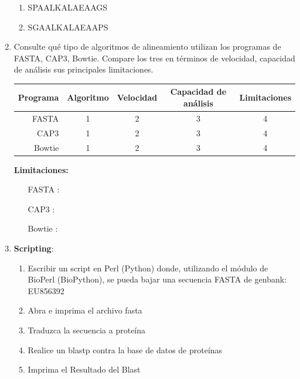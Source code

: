 \documentclass[twoside,letterpaper,12pt]{report}
\begin{document}
\begin{enumerate}
	\begin{enumerate}
		\item SPAALKALAEAAGS	
 		\item SGAALKALAEAAPS	 
	\end{enumerate}

	\item Consulte qué tipo de algoritmos de alineamiento utilizan los programas de FASTA, CAP3, Bowtie. Compare los tres en términos de velocidad, capacidad de análisis sus principales limitaciones.

	\begin{tabular}{|r|c|c|c|c|}
		\hline 
		Programa & Algoritmo & Velocidad & Capacidad de análisis & Limitaciones \\
		\hline
		FASTA & 1 & 2 & 3 & 4 \\
		\hline 
		CAP3 & 1 & 2 & 3 & 4 \\
		\hline
		Bowtie & 1 & 2 & 3 & 4 \\
		\hline
	\end{tabular}

	\textbf{Limitaciones:}
	\begin{itemize}
		\item [FASTA]:
		\item [CAP3]:
		\item [Bowtie]:
	\end{itemize}

	\item \textbf{Scripting}:
	\begin{enumerate}
		\item Escribir un script en Perl (Python) donde, utilizando el módulo de BioPerl (BioPython), se pueda bajar una secuencia FASTA de genbank: EU856392
		\item Abra e imprima el archivo fasta
		\item Traduzca la secuencia a proteína
		\item Realice un blastp contra la base de datos de proteínas
		\item Imprima el Resultado del Blast
	\end{enumerate}


\end{enumerate}





%
\end{document}
